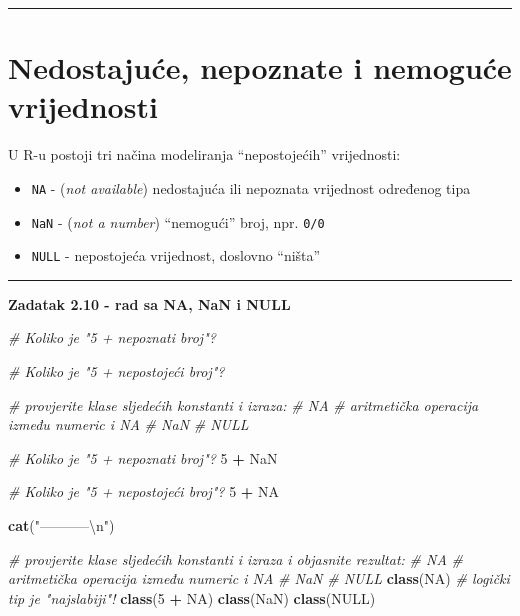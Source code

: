 \documentclass[]{book}
\newenvironment{Shaded}{\begin{snugshade}}{\end{snugshade}}
\newcommand{\KeywordTok}[1]{\textcolor[rgb]{0.13,0.29,0.53}{\textbf{#1}}}
\newcommand{\DecValTok}[1]{\textcolor[rgb]{0.00,0.00,0.81}{#1}}
\newcommand{\CharTok}[1]{\textcolor[rgb]{0.31,0.60,0.02}{#1}}
\newcommand{\StringTok}[1]{\textcolor[rgb]{0.31,0.60,0.02}{#1}}
\newcommand{\CommentTok}[1]{\textcolor[rgb]{0.56,0.35,0.01}{\textit{#1}}}
\newcommand{\OtherTok}[1]{\textcolor[rgb]{0.56,0.35,0.01}{#1}}
\newcommand{\OperatorTok}[1]{\textcolor[rgb]{0.81,0.36,0.00}{\textbf{#1}}}
\newcommand{\NormalTok}[1]{#1}
\providecommand{\tightlist}{%
  \setlength{\itemsep}{0pt}\setlength{\parskip}{0pt}}
\theoremstyle{definition}
\theoremstyle{definition}
\theoremstyle{definition}
\theoremstyle{remark}
\begin{document}
\begin{center}\rule{0.5\linewidth}{\linethickness}\end{center}

\section{Nedostajuće, nepoznate i nemoguće
vrijednosti}\label{nedostajuce-nepoznate-i-nemoguce-vrijednosti}

U R-u postoji tri načina modeliranja ``nepostojećih'' vrijednosti:

\begin{itemize}
\tightlist
\item
  \texttt{NA} - (\emph{not available}) nedostajuća ili nepoznata
  vrijednost određenog tipa
\item
  \texttt{NaN} - (\emph{not a number}) ``nemogući'' broj, npr.
  \texttt{0/0}
\item
  \texttt{NULL} - nepostojeća vrijednost, doslovno ``ništa''
\end{itemize}

\begin{center}\rule{0.5\linewidth}{\linethickness}\end{center}

\textbf{Zadatak 2.10 - rad sa NA, NaN i NULL}

\begin{Shaded}
\begin{Highlighting}[]
\CommentTok{# Koliko je "5 + nepoznati broj"?}


\CommentTok{# Koliko je "5 + nepostojeći broj"?   }


\CommentTok{# provjerite klase sljedećih konstanti i izraza:}
   \CommentTok{#  NA}
   \CommentTok{#  aritmetička operacija između numeric i NA}
   \CommentTok{#  NaN}
   \CommentTok{#  NULL}
\end{Highlighting}
\end{Shaded}

\begin{Shaded}
\begin{Highlighting}[]
\CommentTok{# Koliko je "5 + nepoznati broj"?}
\DecValTok{5} \OperatorTok{+}\StringTok{ }\OtherTok{NaN}

\CommentTok{# Koliko je "5 + nepostojeći broj"?   }
\DecValTok{5} \OperatorTok{+}\StringTok{ }\OtherTok{NA}

\KeywordTok{cat}\NormalTok{(}\StringTok{"-----------}\CharTok{\textbackslash{}n}\StringTok{"}\NormalTok{)}

\CommentTok{# provjerite klase sljedećih konstanti i izraza i objasnite rezultat:}
   \CommentTok{#  NA}
   \CommentTok{#  aritmetička operacija između numeric i NA}
   \CommentTok{#  NaN}
   \CommentTok{#  NULL}
\KeywordTok{class}\NormalTok{(}\OtherTok{NA}\NormalTok{)        }\CommentTok{# logički tip je "najslabiji"!}
\KeywordTok{class}\NormalTok{(}\DecValTok{5} \OperatorTok{+}\StringTok{ }\OtherTok{NA}\NormalTok{)}
\KeywordTok{class}\NormalTok{(}\OtherTok{NaN}\NormalTok{)}
\KeywordTok{class}\NormalTok{(}\OtherTok{NULL}\NormalTok{)}
\end{Highlighting}
\end{Shaded}
\end{document}
